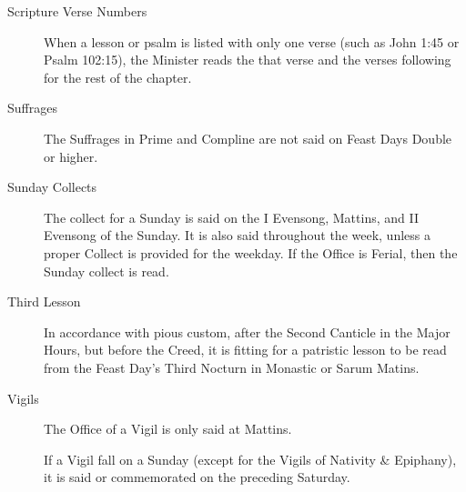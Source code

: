 \begin{description}
\item[Scripture Verse Numbers] When a lesson or psalm is listed with only one verse (such as John 1:45 or Psalm 102:15), the Minister reads the that verse and the verses following for the rest of the chapter.
\item[Suffrages] The Suffrages in Prime and Compline are not said on Feast Days Double or higher.
\item[Sunday Collects] The collect for a Sunday is said on the I Evensong, Mattins, and II Evensong of the Sunday. It is also said throughout the week, unless a proper Collect is provided for the weekday. If the Office is Ferial, then the Sunday collect is read. %
\item[Third Lesson] In accordance with pious custom, after the Second Canticle in the Major Hours, but before the Creed, it is fitting for a patristic lesson to be read from the Feast Day's Third Nocturn in Monastic or Sarum Matins.
\item[Vigils] %
The Office of a Vigil is only said at Mattins.\par
If a Vigil fall on a Sunday (except for the Vigils of Nativity \& Epiphany), it is said or commemorated on the preceding Saturday.
\end{description}
